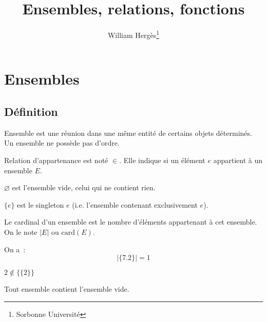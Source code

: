 \documentclass[a4paper, titlepage]{article}
\title{Ensembles, relations, fonctions}
\author{William Hergès\thanks{Sorbonne Université}}
\begin{document}
	\maketitle
	\tableofcontents
	\newpage
    \section{Ensembles}
    \subsection{Définition}
    \begin{defn}
        Ensemble est une réunion dans une même entité de certains objets déterminés.
        Un ensemble ne possède pas d'ordre.
    \end{defn}
    \begin{defn}
        Relation d'appartenance est noté $\in$.
        Elle indique si un élément $e$ appartient à un ensemble $E$.
    \end{defn}
    \begin{defn}
        $\varnothing$ est l'ensemble vide, celui qui ne contient rien.

        $\{e\}$ est le singleton $e$ (i.e. l'ensemble contenant exclusivement $e$).
    \end{defn}
    \begin{defn}
        Le cardinal d'un ensemble est le nombre d'éléments appartenant à cet ensemble.
        On le note $|E|$ ou $\mathrm{card}(E)$.
    \end{defn}
    \begin{exemple}
        On a~:
        $$ |\{7.2\}| = 1 $$
    \end{exemple}
    \begin{warn}
        $2\not\in \{\{2\}\}$
    \end{warn}
    \begin{props}
        Tout ensemble contient l'ensemble vide.
    \end{props}
\end{document}
